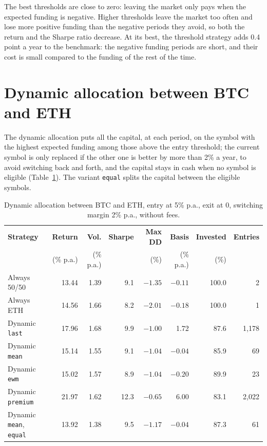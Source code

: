 \documentclass[11pt,a4paper]{article}
\newcommand{\code}[1]{\texttt{#1}}
\begin{document}
The best thresholds are close to zero: leaving the market only pays when the expected funding is negative. Higher
thresholds leave the market too often and lose more positive funding than the negative periods they avoid, so both
the return and the Sharpe ratio decrease. At its best, the threshold strategy adds 0.4 point a year to the benchmark:
the negative funding periods are short, and their cost is small compared to the funding of the rest of the time.

\section{Dynamic allocation between BTC and ETH}\label{sec:dynamic}
The dynamic allocation puts all the capital, at each period, on the symbol with the highest expected funding among
those above the entry threshold; the current symbol is only replaced if the other one is better by more than 2\% a
year, to avoid switching back and forth, and the capital stays in cash when no symbol is eligible
(Table~\ref{tab:dynamic}). The variant \code{equal} splits the capital between the eligible symbols.

\begin{table}[h]
\centering
\small
\begin{tabular}{@{}lrrrrrrr@{}}
\toprule
\textbf{Strategy} & \textbf{Return} & \textbf{Vol.} & \textbf{Sharpe} & \textbf{Max DD} & \textbf{Basis} & \textbf{Invested} & \textbf{Entries} \\
 & (\% p.a.) & (\% p.a.) & & (\%) & (\% p.a.) & (\%) & \\
\midrule
Always 50/50 & 13.44 & 1.39 & 9.1 & $-1.35$ & $-0.11$ & 100.0 & 2 \\
Always ETH & 14.56 & 1.66 & 8.2 & $-2.01$ & $-0.18$ & 100.0 & 1 \\
Dynamic \code{last} & 17.96 & 1.68 & 9.9 & $-1.00$ & 1.72 & 87.6 & 1{,}178 \\
Dynamic \code{mean} & 15.14 & 1.55 & 9.1 & $-1.04$ & $-0.04$ & 85.9 & 69 \\
Dynamic \code{ewm} & 15.02 & 1.57 & 8.9 & $-1.04$ & $-0.20$ & 89.9 & 23 \\
Dynamic \code{premium} & 21.97 & 1.62 & 12.3 & $-0.65$ & 6.00 & 83.1 & 2{,}022 \\
Dynamic \code{mean}, \code{equal} & 13.92 & 1.38 & 9.5 & $-1.17$ & $-0.04$ & 87.3 & 61 \\
\bottomrule
\end{tabular}
\caption{Dynamic allocation between BTC and ETH, entry at 5\% p.a., exit at 0, switching margin 2\% p.a., without
fees.}
\label{tab:dynamic}
\end{table}
\end{document}
